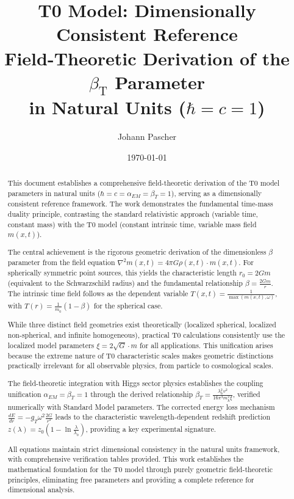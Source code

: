 \documentclass[12pt,a4paper]{article}
\newcommand{\betaT}{\beta_{\text{T}}}
\begin{document}
	
	\title{T0 Model: Dimensionally Consistent Reference \\
		Field-Theoretic Derivation of the $\betaT$ Parameter \\
		in Natural Units ($\hbar = c = 1$)}
	\author{Johann Pascher}
	\date{\today}
	
	\maketitle
	\begin{abstract}
		This document establishes a comprehensive field-theoretic derivation of the T0 model parameters in natural units ($\hbar = c = \alpha_{EM} = \beta_T = 1$), serving as a dimensionally consistent reference framework. The work demonstrates the fundamental time-mass duality principle, contrasting the standard relativistic approach (variable time, constant mass) with the T0 model (constant intrinsic time, variable mass field $m(x,t)$). 
		
		The central achievement is the rigorous geometric derivation of the dimensionless $\beta$ parameter from the field equation $\nabla^2 m(x,t) = 4\pi G \rho(x,t) \cdot m(x,t)$. For spherically symmetric point sources, this yields the characteristic length $r_0 = 2Gm$ (equivalent to the Schwarzschild radius) and the fundamental relationship $\beta = \frac{2Gm}{r}$. The intrinsic time field follows as the dependent variable $T(x,t) = \frac{1}{\max(m(x,t), \omega)}$, with $T(r) = \frac{1}{m_0}(1-\beta)$ for the spherical case. 
		
	
		While three distinct field geometries exist theoretically (localized spherical, localized non-spherical, and infinite homogeneous), practical T0 calculations consistently use the localized model parameters $\xi = 2\sqrt{G} \cdot m$ for all applications. This unification arises because the extreme nature of T0 characteristic scales makes geometric distinctions practically irrelevant for all observable physics, from particle to cosmological scales.
		
		The field-theoretic integration with Higgs sector physics establishes the coupling unification $\alpha_{EM} = \beta_T = 1$ through the derived relationship $\beta_T = \frac{\lambda_h^2 v^2}{16\pi^3 m_h^2 \xi}$, verified numerically with Standard Model parameters. The corrected energy loss mechanism $\frac{dE}{dr} = -g_T \omega^2 \frac{2G}{r^2}$ leads to the characteristic wavelength-dependent redshift prediction $z(\lambda) = z_0(1 - \ln\frac{\lambda}{\lambda_0})$, providing a key experimental signature.
		
		All equations maintain strict dimensional consistency in the natural units framework, with comprehensive verification tables provided. This work establishes the mathematical foundation for the T0 model through purely geometric field-theoretic principles, eliminating free parameters and providing a complete reference for dimensional analysis.
		
		

	\end{abstract}
	
\end{document}
